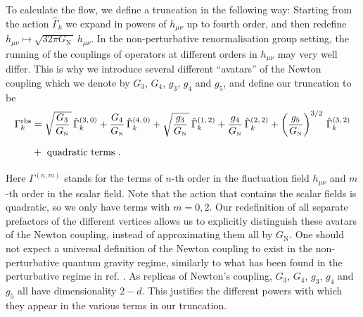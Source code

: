 \documentclass[11pt]{book} %
\newcommand\GNewton{ G_{\scriptscriptstyle{\mathrm{N}}} }
\numberwithin{equation}{chapter}
\begin{document}
To calculate the flow, we define a truncation in the following way:
Starting from the action $\hat\Gamma_k$ we expand in powers of $h_{\mu \nu}$ up to fourth order,
and then redefine $h_{\mu \nu} \mapsto \sqrt{32 \pi \GNewton \,} \, h_{\mu\nu}$.
In the non-perturbative renormalisation group setting,
the running of the couplings of operators at different orders in $h_{\mu \nu}$ may very well differ.
This is why we introduce several different ``avatars'' of the Newton coupling which we denote
by $G_3$, $G_4$, $g_3$, $g_4$ and $g_5$, and define our truncation to be
\begin{align}
  \Gamma_k^\mathrm{rhs} &=
  \sqrt{ \frac{G_3}{\GNewton} \, } \, \hat\Gamma^{(3,\,0)}_k
  + \frac{G_4}{\GNewton} \, \hat\Gamma^{(4,\,0)}_k
  + \sqrt{ \frac{g_3}{\GNewton} \, } \, \hat\Gamma^{(1,\,2)}_k
  + \frac{g_4}{ \GNewton} \, \hat\Gamma^{(2,\,2)}_k
  + \left(\frac{g_5}{ \GNewton}\right)^{3/2} \, \hat\Gamma^{(3,\,2)}_k \nonumber \\
  & + \vphantom{ \sqrt{\frac{g_3}{\GNewton}} }\mbox{ quadratic terms }.
  \label{gammarhs}
\end{align}
Here $\Gamma^{(n,m)}$ stands for the terms of $n$-th order in the fluctuation field $h_{\mu \nu}$
and $m$-th order in the scalar field.
Note that the action that contains the scalar fields is quadratic,
so we only have terms with $m=0,2$.
Our redefinition of all separate prefactors of the different vertices allows us to explicitly distinguish
these avatars of the Newton coupling, instead of approximating them all by $\GNewton$.
One should not expect a universal definition of the Newton coupling to exist in the non-perturbative
quantum gravity regime, similarly to what has been found in the perturbative regime in
ref. \cite{Anber:2011ut}.
As replicas of Newton's coupling, $G_3$, $G_4$, $g_3$, $g_4$ and $g_5$ all have dimensionality $2-d$.
This justifies the different powers with which they appear
in the various terms in our truncation.
\end{document}
